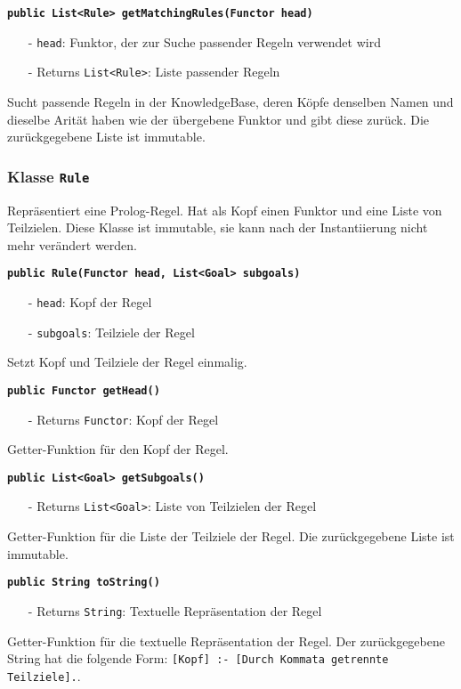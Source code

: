 \documentclass[parskip=full,11pt,twoside]{scrartcl}
\begin{document}
\textbf{\texttt{public List<Rule> getMatchingRules(Functor head)}}
\begin{itemize}[noitemsep]
	\item[-] \texttt{head}: Funktor, der zur Suche passender Regeln verwendet wird
	\item[-] Returns \texttt{List<Rule>}: Liste passender Regeln
\end{itemize}
Sucht passende Regeln in der KnowledgeBase, deren Köpfe denselben Namen und dieselbe Arität haben wie der übergebene Funktor und gibt diese zurück. Die zurückgegebene Liste ist immutable.

\subsubsection{Klasse \texttt{Rule}}
Repräsentiert eine Prolog-Regel. Hat als Kopf einen Funktor und eine Liste von Teilzielen. Diese Klasse ist immutable, sie kann nach der Instantiierung nicht mehr verändert werden.

\textbf{\texttt{public Rule(Functor head, List<Goal> subgoals)}}
\begin{itemize}[noitemsep]
	\item[-] \texttt{head}: Kopf der Regel
	\item[-] \texttt{subgoals}: Teilziele der Regel
\end{itemize}
Setzt Kopf und Teilziele der Regel einmalig.

\textbf{\texttt{public Functor getHead()}}
\begin{itemize}[noitemsep]
	\item[-] Returns \texttt{Functor}: Kopf der Regel
\end{itemize}
Getter-Funktion für den Kopf der Regel.

\textbf{\texttt{public List<Goal> getSubgoals()}}
\begin{itemize}[noitemsep]
	\item[-] Returns \texttt{List<Goal>}: Liste von Teilzielen der Regel
\end{itemize}
Getter-Funktion für die Liste der Teilziele der Regel. Die zurückgegebene Liste ist immutable.

\textbf{\texttt{public String toString()}}
\begin{itemize}[noitemsep]
	\item[-] Returns \texttt{String}: Textuelle Repräsentation der Regel
\end{itemize}
Getter-Funktion für die textuelle Repräsentation der Regel. Der zurückgegebene String hat die folgende Form: \texttt{[Kopf] :- [Durch Kommata getrennte Teilziele].}.
\end{document}

